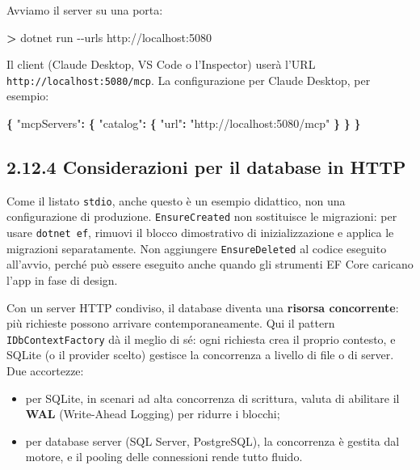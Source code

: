 \documentclass[
  italian,
  10pt,
]{book}
\newenvironment{Shaded}{\begin{snugshade}}{\end{snugshade}}
\newcommand{\AttributeTok}[1]{\textcolor[rgb]{0.13,0.29,0.53}{#1}}
\newcommand{\DataTypeTok}[1]{\textcolor[rgb]{0.13,0.29,0.53}{#1}}
\newcommand{\ExtensionTok}[1]{#1}
\newcommand{\FunctionTok}[1]{\textcolor[rgb]{0.13,0.29,0.53}{\textbf{#1}}}
\newcommand{\NormalTok}[1]{#1}
\newcommand{\OperatorTok}[1]{\textcolor[rgb]{0.81,0.36,0.00}{\textbf{#1}}}
\newcommand{\StringTok}[1]{\textcolor[rgb]{0.31,0.60,0.02}{#1}}
\providecommand{\tightlist}{%
  \setlength{\itemsep}{0pt}\setlength{\parskip}{0pt}}
\begin{document}
Avviamo il server su una porta:

\begin{Shaded}
\begin{Highlighting}[]
\OperatorTok{\textgreater{}}\NormalTok{ dotnet }\ExtensionTok{run} \AttributeTok{{-}{-}urls}\NormalTok{ http://localhost:5080}
\end{Highlighting}
\end{Shaded}

Il client (Claude Desktop, VS Code o l'Inspector) userà l'URL
\texttt{http://localhost:5080/mcp}. La configurazione per Claude
Desktop, per esempio:

\begin{Shaded}
\begin{Highlighting}[]
\FunctionTok{\{}
  \DataTypeTok{"mcpServers"}\FunctionTok{:} \FunctionTok{\{}
    \DataTypeTok{"catalog"}\FunctionTok{:} \FunctionTok{\{}
      \DataTypeTok{"url"}\FunctionTok{:} \StringTok{"http://localhost:5080/mcp"}
    \FunctionTok{\}}
  \FunctionTok{\}}
\FunctionTok{\}}
\end{Highlighting}
\end{Shaded}

\subsection{2.12.4 Considerazioni per il database in
HTTP}\label{considerazioni-per-il-database-in-http}

Come il listato \texttt{stdio}, anche questo è un esempio didattico, non
una configurazione di produzione. \texttt{EnsureCreated} non sostituisce
le migrazioni: per usare \texttt{dotnet\ ef}, rimuovi il blocco
dimostrativo di inizializzazione e applica le migrazioni separatamente.
Non aggiungere \texttt{EnsureDeleted} al codice eseguito all'avvio,
perché può essere eseguito anche quando gli strumenti EF Core caricano
l'app in fase di design.

Con un server HTTP condiviso, il database diventa una \textbf{risorsa
concorrente}: più richieste possono arrivare contemporaneamente. Qui il
pattern \texttt{IDbContextFactory} dà il meglio di sé: ogni richiesta
crea il proprio contesto, e SQLite (o il provider scelto) gestisce la
concorrenza a livello di file o di server. Due accortezze:

\begin{itemize}
\tightlist
\item
  per SQLite, in scenari ad alta concorrenza di scrittura, valuta di
  abilitare il \textbf{WAL} (Write-Ahead Logging) per ridurre i blocchi;
\item
  per database server (SQL Server, PostgreSQL), la concorrenza è gestita
  dal motore, e il pooling delle connessioni rende tutto fluido.
\end{itemize}
\end{document}
